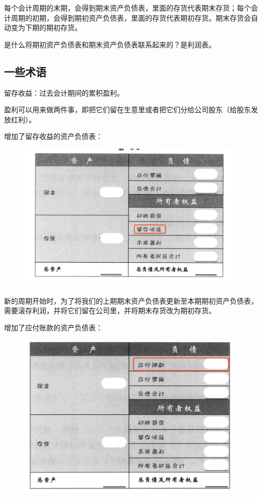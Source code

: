 \documentclass[12pt]{article}
\begin{document}
每个会计周期的末期，会得到期末资产负债表，里面的存货代表期末存货；每个会计周期的初期，会得到期初资产负债表，里面的存货代表期初存货。期末存货会自动变为下期的期初存货。

是什么将期初资产负债表和期末资产负债表联系起来的？是利润表。

\subsection{一些术语}
留存收益：过去会计期间的累积盈利。

盈利可以用来做两件事，即把它们留在生意里或者把它们分给公司股东（给股东发放红利）。

增加了留存收益的资产负债表：
\begin{figure}[H]
    \centering
    \includegraphics[width=1\textwidth]{fig/accounting_3.png}
\end{figure}

新的周期开始时，为了将我们的上期期末资产负债表更新至本期期初资产负债表，需要滚存利润，并将它们留在公司里，并将期末存货改为期初存货。

增加了应付账款的资产负债表：
\begin{figure}[H]
    \centering
    \includegraphics[width=1\textwidth]{fig/accounting_4.png}
\end{figure}
\end{document}
